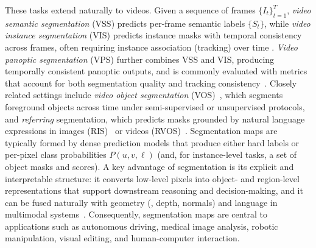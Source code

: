 These tasks extend naturally to videos. Given a sequence of
frames $\{I_t\}_{t=1}^{T}$, \emph{video semantic segmentation} (VSS) predicts per-frame semantic labels $\{S_t\}$, while \emph{video instance segmentation} (VIS) predicts instance masks with temporal consistency across frames, often requiring instance association (tracking) over time \cite{li2023seg_survey}. 
\emph{Video panoptic segmentation} (VPS) further combines VSS and VIS, producing temporally consistent panoptic outputs, and is commonly evaluated with metrics that account for both segmentation quality and tracking consistency~\cite{li2023seg_survey}. 
Closely related
settings include \emph{video object segmentation} (VOS)~\cite{perazzi2016benchmark}, which segments foreground objects across time under semi-supervised or unsupervised protocols, and \emph{referring} segmentation, which predicts masks grounded by natural language expressions in images (RIS)~\cite{wang2022cris} or videos (RVOS)~\cite{seo2020urvos}.
Segmentation maps are typically formed by dense prediction models that produce either hard labels or per-pixel class probabilities $P(u,v,\ell)$ (and, for instance-level tasks, a set of object masks and scores). 
A key advantage of segmentation is its explicit and interpretable structure: it converts low-level pixels into object- and region-level representations that support downstream reasoning and decision-making, and it can be fused naturally with geometry (\eg, depth, normals) and language in multimodal systems~\cite{li2023seg_survey}. 
Consequently, segmentation maps are central to applications such as autonomous driving,
medical image analysis, robotic manipulation, visual editing, and human-computer interaction.



